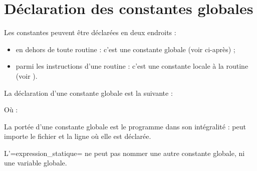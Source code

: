 




\chapter{Déclaration des constantes globales}

Les constantes peuvent être déclarées en deux endroits :
\begin{itemize}
  \item en dehors de toute routine : c'est une constante globale (voir ci-après) ;
  \item parmi les instructions d'une routine : c'est une constante locale à la routine (voir ).
\end{itemize}





La déclaration d'une constante globale est la suivante :


Où :

La portée d'une constante globale est le programme dans son intégralité : peut importe le fichier et la ligne où elle est déclarée.

L'\plm=expression_statique= ne peut pas nommer une autre constante globale, ni une variable globale. 

